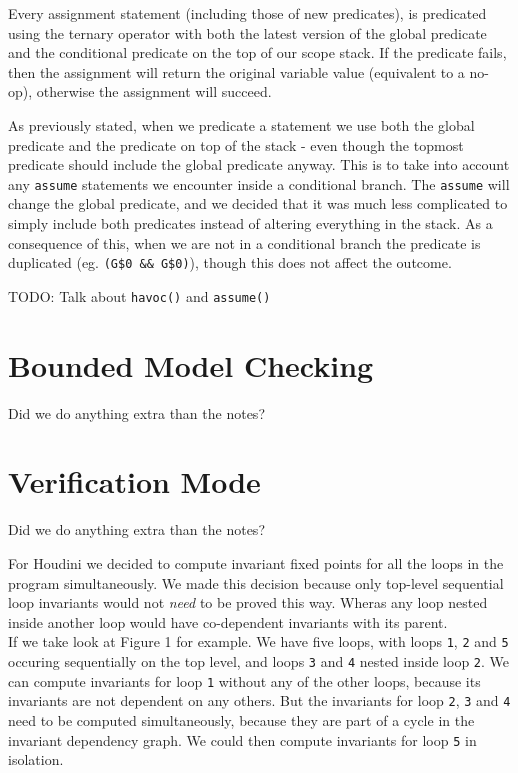 \documentclass[11pt]{article}
\begin{document}
Every assignment statement (including those of new predicates), is predicated using the ternary operator with both the latest version of the global predicate and the conditional predicate on the top of our scope stack. If the predicate fails, then the assignment will return the original variable value (equivalent to a no-op), otherwise the assignment will succeed.

As previously stated, when we predicate a statement we use both the global predicate and the predicate on top of the stack - even though the topmost predicate should include the global predicate anyway. This is to take into account any \verb|assume| statements we encounter inside a conditional branch. The \verb|assume| will change the global predicate, and we decided that it was much less complicated to simply include both predicates instead of altering everything in the stack. As a consequence of this, when we are not in a conditional branch the predicate is duplicated (eg. \verb|(G$0 && G$0)|), though this does not affect the outcome.

TODO: Talk about \verb|havoc()| and \verb|assume()|

\section{Bounded Model Checking}

Did we do anything extra than the notes?

\section{Verification Mode}

Did we do anything extra than the notes?

For Houdini we decided to compute invariant fixed points for all the loops in the program simultaneously.
We made this decision because only top-level sequential loop invariants would not \emph{need} to be proved
this way. Wheras any loop nested inside another loop would have co-dependent invariants with its parent. \\

If we take look at Figure 1 for example. We have five loops, with loops \verb|1|, \verb|2| and \verb|5| occuring
sequentially on the top level, and loops \verb|3| and \verb|4| nested inside loop \verb|2|. We can compute
invariants for loop \verb|1| without any of the other loops, because its invariants are not dependent on any
others. But the invariants for loop \verb|2|, \verb|3| and \verb|4| need to be computed simultaneously, because
they are part of a cycle in the invariant dependency graph. We could then compute invariants for loop \verb|5|
in isolation. \\
\end{document}
